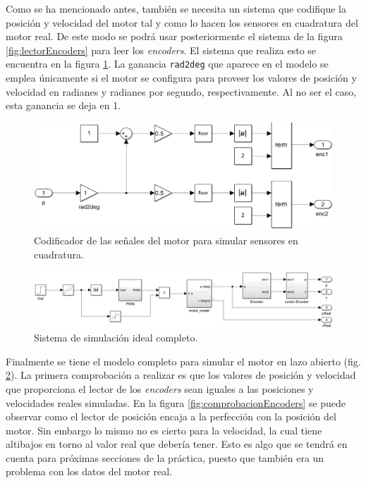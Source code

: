 \documentclass{article}
\newcommand{\code}[1]{\colorbox{light-gray}{\texttt{#1}}}
\begin{document}
Como se ha mencionado antes, también se necesita un sistema que codifique la posición y velocidad del motor tal y como lo hacen los sensores en cuadratura del motor real. De este modo se podrá usar posteriormente el sistema de la figura \ref{fig:lectorEncoders} para leer los \textit{encoders}. El sistema que realiza esto se encuentra en la figura \ref{fig:encoder}. La ganancia \code{rad2deg} que aparece en el modelo se emplea únicamente si el motor se configura para proveer los valores de posición y velocidad en radianes y radianes por segundo, respectivamente. Al no ser el caso, esta ganancia se deja en 1.

\begin{figure}[H]
    \centering
    \includegraphics[width=0.75\linewidth]{img/encoder.png}
    \caption{Codificador de las señales del motor para simular sensores en cuadratura.}
    \label{fig:encoder}
\end{figure}

\begin{figure}[H]
    \centering
    \includegraphics[width=0.75\linewidth]{img/simIdeal.png}
    \caption{Sistema de simulación ideal completo.}
    \label{fig:simIdeal}
\end{figure}

Finalmente se tiene el modelo completo para simular el motor en lazo abierto (fig. \ref{fig:simIdeal}). La primera comprobación a realizar es que los valores de posición y velocidad que proporciona el lector de los \textit{encoders} sean iguales a las posiciones y velocidades reales simuladas. En la figura \ref{fig:comprobacionEncoders} se puede observar como el lector de posición encaja a la perfección con la posición del motor. Sin embargo lo mismo no es cierto para la velocidad, la cual tiene altibajos en torno al valor real que debería tener. Esto es algo que se tendrá en cuenta para próximas secciones de la práctica, puesto que también era un problema con los datos del motor real.
\end{document}
